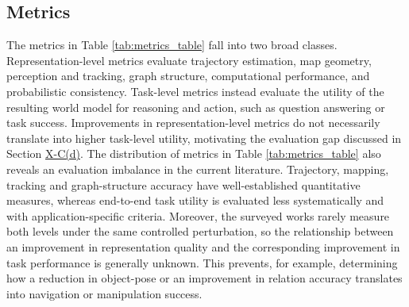\subsection{Metrics}\label{sec:evaluation_metrics_metrics}
The metrics in Table \ref{tab:metrics_table} fall into two broad classes.
Representation-level metrics evaluate trajectory estimation, map geometry, perception and tracking, graph structure, computational performance, and probabilistic consistency.
Task-level metrics instead evaluate the utility of the resulting world model for reasoning and action, such as question answering or task success.
Improvements in representation-level metrics do not necessarily translate into higher task-level utility, motivating the evaluation gap discussed in Section \hyperref[sec:open_challenges_metrics_gap]{X-C(d)}.
The distribution of metrics in Table \ref{tab:metrics_table} also reveals an evaluation imbalance in the current literature.
Trajectory, mapping, tracking and graph-structure accuracy have well-established quantitative measures, whereas end-to-end task utility is evaluated less systematically and with application-specific criteria.
Moreover, the surveyed works rarely measure both levels under the same controlled perturbation, so the relationship between an improvement in representation quality and the corresponding improvement in task performance is generally unknown. 
This prevents, for example, determining how a reduction in object-pose or an improvement in relation accuracy translates into navigation or manipulation success.
